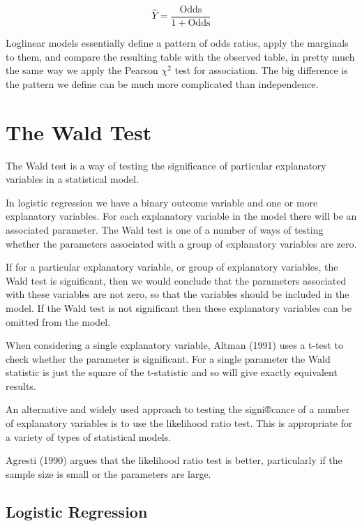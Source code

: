 \documentclass[12pt]{article}
\begin{document}
\[ \hat{Y} = \frac{\mbox{Odds}}{1+\mbox{Odds}} \]


Loglinear models essentially define a pattern of odds ratios, apply the marginals to them, and compare the resulting table with the observed table, in pretty much the same way we apply the Pearson  $\chi^2$ test for association. The big difference is the pattern we define can be much more complicated than independence.

\newpage
\section{The Wald Test}

The Wald test is a way of testing the significance of particular explanatory variables in a statistical model. 

In logistic regression we have a binary outcome variable and one or more explanatory variables. For each explanatory variable in the model there will be an associated parameter. The Wald test is one of a number of ways of testing whether the parameters associated with a group of explanatory variables are zero.

If for a particular explanatory variable, or group of explanatory variables, the Wald test is significant, then we would conclude that the parameters associated with these variables are not zero, so that the variables should be included in the model. If the Wald test is not significant then these explanatory variables can be omitted from the model. 

When considering a single explanatory variable, Altman (1991) uses a t-test to check whether the parameter is significant. For a single parameter the Wald statistic is just the square of the t-statistic and so will give exactly equivalent results.

An alternative and widely used approach to testing the signi®cance of a number of explanatory variables is to use the likelihood ratio test. This is appropriate for a variety of types of statistical models. 

Agresti (1990) argues that the likelihood ratio test is better, particularly if the sample size is small or the parameters are large.

\subsection{Logistic Regression}
\end{document}
